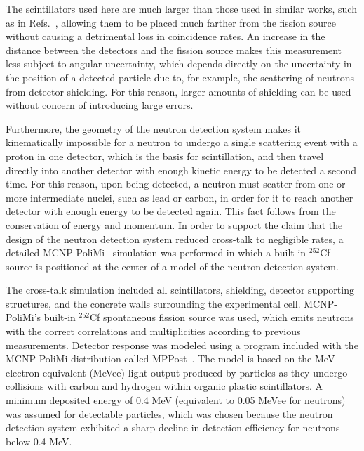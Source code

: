 The scintillators used here are much larger than those used in similar works, such as in Refs.~\cite{Pozzi2016,Verbeke2018}, allowing them to be placed much farther from the fission source without causing a detrimental loss in coincidence rates. 
An increase in the distance between the detectors and the fission source makes this measurement less subject to angular uncertainty, which depends directly on the uncertainty in the position of a detected particle due to, for example, the scattering of neutrons from detector shielding.
For this reason, larger amounts of shielding can be used without concern of introducing large errors.
 
Furthermore, the geometry of the neutron detection system makes it kinematically impossible for a neutron to undergo a single scattering event with a proton in one detector, which is the basis for scintillation, and then travel directly into another detector with enough kinetic energy to be detected a second time.
For this reason, upon being detected, a neutron must scatter from one or more intermediate nuclei, such as lead or carbon, in order for it to reach another detector with enough energy to be detected again.
This fact follows from the conservation of energy and momentum.
In order to support the claim that the design of the neutron detection system reduced cross-talk to negligible rates, a detailed MCNP-PoliMi~\cite{MCNP_POLIMI} simulation was performed in which a built-in $^{252}$Cf source is positioned at the center of a model of the neutron detection system.

The cross-talk simulation included all scintillators, shielding, detector supporting structures, and the concrete walls surrounding the experimental cell.
MCNP-PoliMi's built-in $^{252}$Cf spontaneous fission source was used, which emits neutrons with the correct correlations and multiplicities according to previous measurements.
Detector response was modeled using a program included with the MCNP-PoliMi distribution called MPPost~\cite{MPPost}.
The model is based on the MeV electron equivalent (MeVee) light output produced by particles as they undergo collisions with carbon and hydrogen within organic plastic scintillators.
A minimum deposited energy of 0.4 MeV (equivalent to 0.05 MeVee for neutrons) was assumed for detectable particles, which was chosen because the neutron detection system exhibited a sharp decline in detection efficiency for neutrons below 0.4 MeV.

